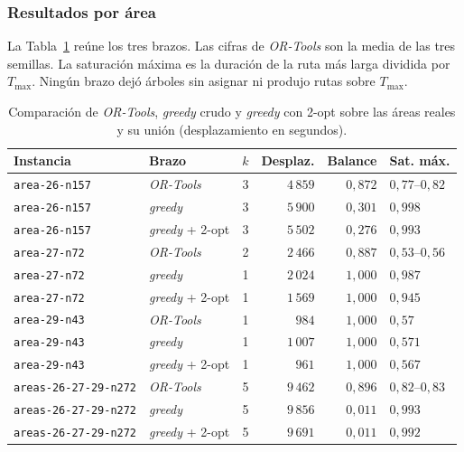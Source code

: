 \subsubsection*{Resultados por área}

La Tabla~\ref{tab:areas-brazos} reúne los tres brazos. Las cifras de
\textit{OR-Tools} son la media de las tres semillas. La saturación máxima es la
duración de la ruta más larga dividida por $T_{\max}$. Ningún brazo dejó árboles
sin asignar ni produjo rutas sobre $T_{\max}$.

\begin{table}[H]
  \centering
  \caption{Comparación de \textit{OR-Tools}, \textit{greedy} crudo y \textit{greedy} con 2-opt sobre las áreas reales y su unión (desplazamiento en segundos).}
  \label{tab:areas-brazos}
  \begin{tabularx}{\textwidth}{lXrrrl}
    \toprule
    Instancia & Brazo & $k$ & Desplaz. & Balance & Sat. máx. \\
    \midrule
    \texttt{area-26-n157} & \textit{OR-Tools}      & 3 & $4\,859$ & $0{,}872$ & $0{,}77$--$0{,}82$ \\
    \texttt{area-26-n157} & \textit{greedy}        & 3 & $5\,900$ & $0{,}301$ & $0{,}998$ \\
    \texttt{area-26-n157} & \textit{greedy} + 2-opt& 3 & $5\,502$ & $0{,}276$ & $0{,}993$ \\
    \midrule
    \texttt{area-27-n72}  & \textit{OR-Tools}      & 2 & $2\,466$ & $0{,}887$ & $0{,}53$--$0{,}56$ \\
    \texttt{area-27-n72}  & \textit{greedy}        & 1 & $2\,024$ & $1{,}000$ & $0{,}987$ \\
    \texttt{area-27-n72}  & \textit{greedy} + 2-opt& 1 & $1\,569$ & $1{,}000$ & $0{,}945$ \\
    \midrule
    \texttt{area-29-n43}  & \textit{OR-Tools}      & 1 & $984$ & $1{,}000$ & $0{,}57$ \\
    \texttt{area-29-n43}  & \textit{greedy}        & 1 & $1\,007$ & $1{,}000$ & $0{,}571$ \\
    \texttt{area-29-n43}  & \textit{greedy} + 2-opt& 1 & $961$ & $1{,}000$ & $0{,}567$ \\
    \midrule
    \texttt{areas-26-27-29-n272} & \textit{OR-Tools}       & 5 & $9\,462$ & $0{,}896$ & $0{,}82$--$0{,}83$ \\
    \texttt{areas-26-27-29-n272} & \textit{greedy}         & 5 & $9\,856$ & $0{,}011$ & $0{,}993$ \\
    \texttt{areas-26-27-29-n272} & \textit{greedy} + 2-opt & 5 & $9\,691$ & $0{,}011$ & $0{,}992$ \\
    \bottomrule
  \end{tabularx}
\end{table}

